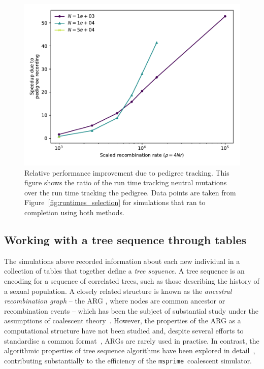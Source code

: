\documentclass{article}
\newcommand{\simupop}{\texttt{simuPOP}}
\newcommand{\msprime}{\texttt{msprime}}
\begin{document}
\begin{figure}
    \includegraphics[]{sims/speedup}
    \caption{\label{fig:relative_speedup_selection}Relative performance improvement due to pedigree tracking. This figure
    shows the ratio of the run time tracking neutral mutations over the run time tracking the pedigree. Data points are taken
from Figure~\ref{fig:runtimes_selection} for simulations that ran to completion using both methods.}
\end{figure}

%



\subsection*{Working with a tree sequence through tables}

The simulations above recorded information about each new individual
in a collection of tables that together define a \emph{tree sequence}.
A {tree sequence} is an encoding for a sequence of correlated trees,
such as those describing the history of a sexual population.
A closely related structure is known as the \emph{ancestral recombination graph} --
the {ARG} \citep{griffiths1991two,griffiths1997ancestral},
where nodes are common ancestor or recombination events --
which has been the subject of substantial study
under the assumptions of coalescent
theory~\citep{wiuf1997number,wiuf1999ancestry,marjoram2006coalescent,wilton2015smc}.
However, the properties of the ARG as a computational structure have not
been studied and, despite several efforts to standardise a common
format~\citep{morin2006netgen,mcgill2013graphml}, %
ARGs are rarely used
in practise. In contrast, the algorithmic properties of tree sequence
algorithms have been explored in detail~\citep{kelleher2016efficient},
contributing substantially to the efficiency of the \msprime\ coalescent simulator.
\end{document}
